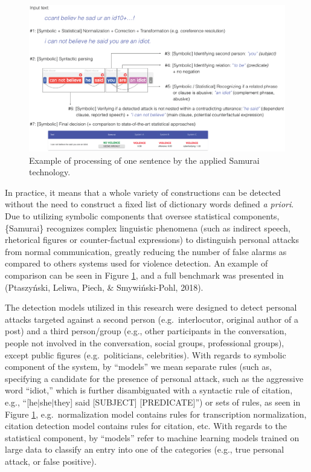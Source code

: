 \documentclass[
  10pt,
  dvipsnames]{scrartcl}
\begin{document}
\begin{figure}[h]
    \centering
    \includegraphics[width=\linewidth]{../images/example.eps}
    \caption{Example of processing of one sentence by the applied Samurai technology.}
    \label{fig:samuraiexample}
\end{figure}

In practice, it means that a whole variety of constructions can be
detected without the need to construct a fixed list of dictionary words
defined \textit{a priori}. Due to utilizing symbolic components that
oversee statistical components, \{\textsf Samurai\} recognizes complex
linguistic phenomena (such as indirect speech, rhetorical figures or
counter-factual expressions) to distinguish personal attacks from normal
communication, greatly reducing the number of false alarms as compared
to others systems used for violence detection. An example of comparison
can be seen in Figure \ref{fig:samuraiexample}, and a full benchmark was
presented in (Ptaszyński, Leliwa, Piech, \& Smywiński-Pohl, 2018).

The detection models utilized in this research were designed to detect
personal attacks targeted against a second person (e.g.~interlocutor,
original author of a post) and a third person/group (e.g., other
participants in the conversation, people not involved in the
conversation, social groups, professional groups), except public figures
(e.g.~politicians, celebrities). With regards to symbolic component of
the system, by ``models'' we mean separate rules (such as, specifying a
candidate for the presence of personal attack, such as the aggressive
word ``idiot,'' which is further disambiguated with a syntactic rule of
citation, e.g., ``{[}he\(\vert\)she\(\vert\)they{]} said {[}SUBJECT{]}
{[}PREDICATE{]}'') or sets of rules, as seen in Figure
\ref{fig:samuraiexample}, e.g.~normalization model contains rules for
transcription normalization, citation detection model contains rules for
citation, etc. With regards to the statistical component, by ``models''
refer to machine learning models trained on large data to classify an
entry into one of the categories (e.g., true personal attack, or false
positive).
\end{document}
